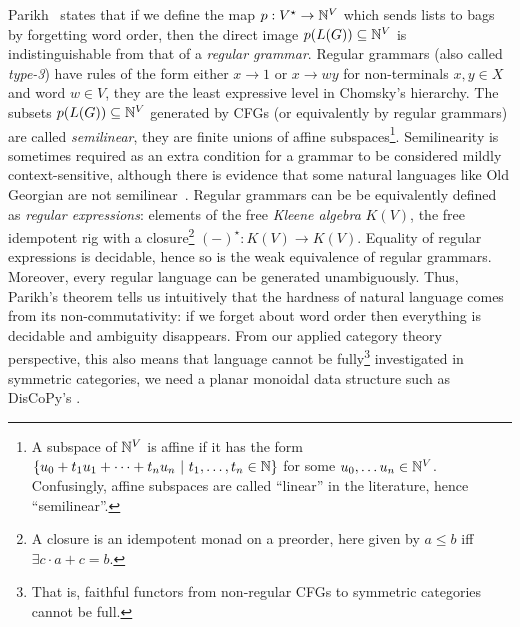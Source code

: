 Parikh~\cite[Theorem~2]{Parikh66} states that if we define the map $p : V^\star \to \mathbb{N}^V$ which sends lists to bags by forgetting word order, then the direct image $p(L(G)) \subseteq \mathbb{N}^V$ is indistinguishable from that of a \emph{regular grammar}.
Regular grammars (also called \emph{type-3}) have rules of the form either $x \to 1$ or $x \to w y$ for non-terminals $x, y \in X$ and word $w \in V$, they are the least expressive level in Chomsky's hierarchy.
The subsets $p(L(G)) \subseteq \mathbb{N}^V$ generated by CFGs (or equivalently by regular grammars) are called \emph{semilinear}, they are finite unions of affine subspaces\footnote
{A subspace of $\mathbb{N}^V$ is affine if it has the form $\{ u_0 + t_1 u_1 + \dots + t_n u_n \ \vert \ t_1, \dots, t_n \in \mathbb{N} \}$ for some $u_0, \dots u_n \in \mathbb{N}^V$.
Confusingly, affine subspaces are called ``linear'' in the literature, hence ``semilinear''.
}.
Semilinearity is sometimes required as an extra condition for a grammar to be considered mildly context-sensitive, although there is evidence that some natural languages like Old Georgian are not semilinear~\cite{MichaelisKracht97}.
Regular grammars can be be equivalently defined as \emph{regular expressions}: elements of the free \emph{Kleene algebra} $K(V)$, the free idempotent rig with a closure\footnote
{A closure is an idempotent monad on a preorder, here given by $a \leq b$ iff $\exists c \cdot a + c = b$.} $(-)^\star : K(V) \to K(V)$.
Equality of regular expressions is decidable, hence so is the weak equivalence of regular grammars.
Moreover, every regular language can be generated unambiguously.
Thus, Parikh's theorem tells us intuitively that the hardness of natural language comes from its non-commutativity: if we forget about word order then everything is decidable and ambiguity disappears.
From our applied category theory perspective, this also means that language cannot be fully\footnote
{That is, faithful functors from non-regular CFGs to symmetric categories cannot be full.} investigated in symmetric categories, we need a planar monoidal data structure such as DisCoPy's .
